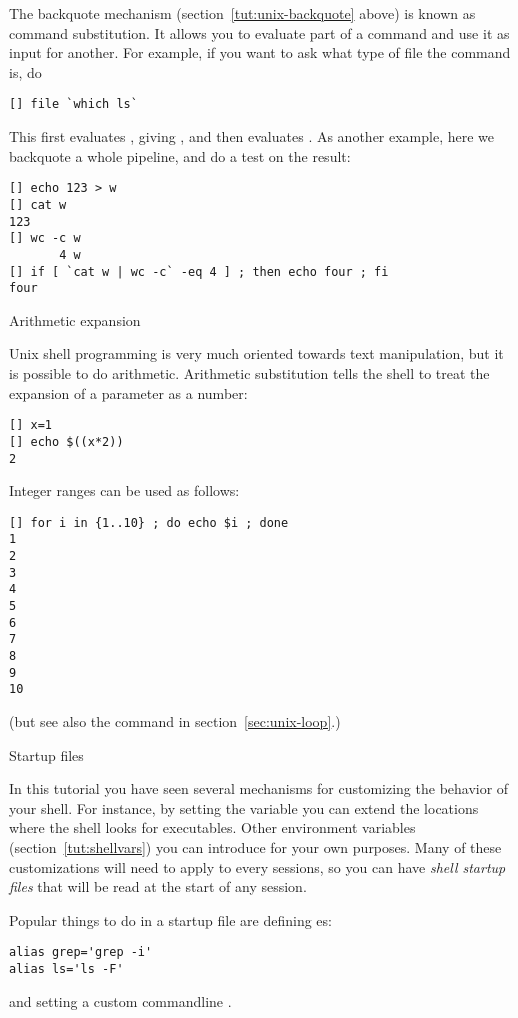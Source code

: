 The backquote mechanism (section~\ref{tut:unix-backquote} above)
is known as command substitution. It allows you to evaluate part
of a command and use it as input for another. For example,
if you want to ask what type of file the command  is, do
\begin{verbatim}
[] file `which ls`
\end{verbatim}
This first evaluates , giving , and then
evaluates . As another example, here
we backquote a whole pipeline, and do a test on the result:
\begin{verbatim}
[] echo 123 > w
[] cat w
123
[] wc -c w
       4 w
[] if [ `cat w | wc -c` -eq 4 ] ; then echo four ; fi
four
\end{verbatim}

 {Arithmetic expansion}
\label{sec:arith-expansion}

Unix shell programming is very much oriented towards text manipulation, but it 
is possible to do arithmetic. 
Arithmetic substitution tells the shell to treat the expansion of a
parameter as a number:
\begin{verbatim}
[] x=1
[] echo $((x*2))
2
\end{verbatim}

Integer ranges can be used as follows:
\begin{verbatim}
[] for i in {1..10} ; do echo $i ; done
1
2
3
4
5
6
7
8
9
10
\end{verbatim}
(but see also the  command in section~\ref{sec:unix-loop}.)

 {Startup files}

In this tutorial you have seen several mechanisms for customizing
the behavior of your shell. For instance, by setting the 
variable you can extend the locations where the shell looks for executables.
Other environment variables (section~\ref{tut:shellvars}) you can
introduce for your own purposes. Many of these customizations will
need to apply to every sessions, so you can have 
\emph{shell startup files} that will be read at the start of any session.

Popular things to do in a startup file are defining es:
\begin{verbatim}
alias grep='grep -i'
alias ls='ls -F'
\end{verbatim}
and setting a custom commandline .

